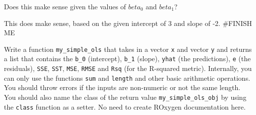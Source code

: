 \documentclass[
]{article}
\begin{document}
Does this make sense given the values of \(beta_0\) and \(beta_1\)?

This does make sense, based on the given intercept of 3 and slope of -2.
\#FINISH ME

Write a function \texttt{my\_simple\_ols} that takes in a vector
\texttt{x} and vector \texttt{y} and returns a list that contains the
\texttt{b\_0} (intercept), \texttt{b\_1} (slope), \texttt{yhat} (the
predictions), \texttt{e} (the residuals), \texttt{SSE}, \texttt{SST},
\texttt{MSE}, \texttt{RMSE} and \texttt{Rsq} (for the R-squared metric).
Internally, you can only use the functions \texttt{sum} and
\texttt{length} and other basic arithmetic operations. You should throw
errors if the inputs are non-numeric or not the same length. You should
also name the class of the return value \texttt{my\_simple\_ols\_obj} by
using the \texttt{class} function as a setter. No need to create ROxygen
documentation here.
\end{document}
